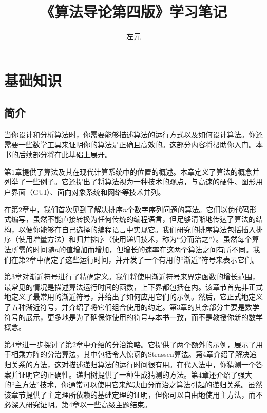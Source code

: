 \documentclass[lang=cn,newtx,10pt,scheme=chinese]{elegantbook}
\title{《算法导论第四版》学习笔记}
\author{左元}
\begin{document}
\maketitle
\frontmatter

\tableofcontents

\mainmatter

\part{基础知识}

\chapter*{简介}

当你设计和分析算法时，你需要能够描述算法的运行方式以及如何设计算法。你还需要一些数学工具来证明你的算法是正确且高效的。这部分内容将帮助你入门。本书的后续部分将在此基础上展开。

第1章提供了算法及其在现代计算系统中的位置的概述。本章定义了算法的概念并列举了一些例子。它还提出了将算法视为一种技术的观点，与高速的硬件、图形用户界面（GUI）、面向对象系统和网络等技术并列。

在第2章中，我们首次见到了解决排序$n$个数字序列问题的算法。它们以伪代码形式编写，虽然不能直接转换为任何传统的编程语言，但足够清晰地传达了算法的结构，以便你能够在自己选择的编程语言中实现它。我们研究的排序算法包括插入排序（使用增量方法）和归并排序（使用递归技术，称为“分而治之”）。虽然每个算法所需的时间随$n$的值增加而增加，但增长的速率在这两个算法之间有所不同。我们在第2章中确定了这些运行时间，并开发了一个有用的“渐近”符号来表示它们。

第3章对渐近符号进行了精确定义。我们将使用渐近符号来界定函数的增长范围，最常见的情况是描述算法运行时间的函数，上下界都包括在内。该章节首先非正式地定义了最常用的渐近符号，并给出了如何应用它们的示例。然后，它正式地定义了五种渐近符号，并介绍了将它们组合使用的约定。第3章的其余部分主要是数学符号的展示，更多地是为了确保你使用的符号与本书一致，而不是教授你新的数学概念。

第4章进一步探讨了第2章中介绍的分治策略。它提供了两个额外的示例，展示了用于相乘方阵的分治算法，其中包括令人惊讶的Strassen算法。第4章介绍了解决递归关系的方法，这对描述递归算法的运行时间很有用。在代入法中，你猜测一个答案并证明它的正确性。递归树提供了一种生成猜测的方法。第4章还介绍了强大的“主方法”技术，你通常可以使用它来解决由分而治之算法引起的递归关系。虽然该章节提供了主定理所依赖的基础定理的证明，但你可以自由地使用主方法，而不必深入研究证明。第4章以一些高级主题结束。
\end{document}
